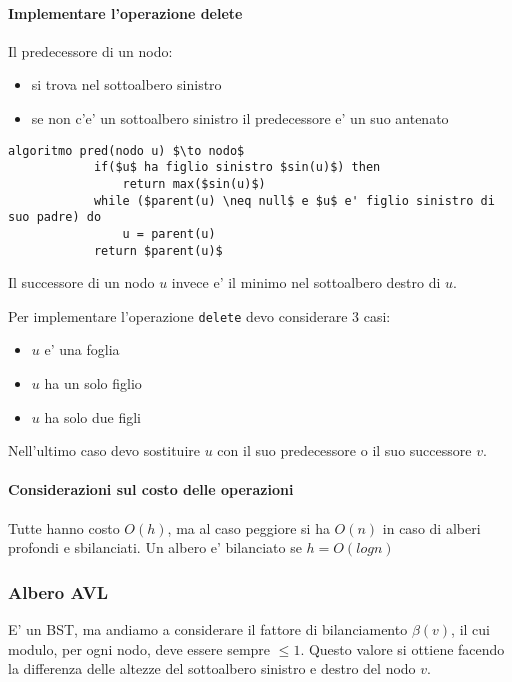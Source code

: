     \paragraph{Implementare l'operazione delete}
    Il predecessore di un nodo:
    \begin{itemize}
        \item si trova nel sottoalbero sinistro
        \item se non c'e' un sottoalbero sinistro il predecessore e' un suo antenato
    \end{itemize}

    \begin{lstlisting}[mathescape=true]
        algoritmo pred(nodo u) $\to nodo$
            if($u$ ha figlio sinistro $sin(u)$) then
                return max($sin(u)$)
            while ($parent(u) \neq null$ e $u$ e' figlio sinistro di suo padre) do
                u = parent(u)
            return $parent(u)$
    \end{lstlisting}

    Il successore di un nodo $u$ invece e' il minimo nel sottoalbero destro di $u$.

    Per implementare l'operazione \texttt{delete} devo considerare 3 casi:
    \begin{itemize}
        \item $u$ e' una foglia
        \item $u$ ha un solo figlio
        \item $u$ ha solo due figli
    \end{itemize}

    Nell'ultimo caso devo sostituire $u$ con il suo predecessore o il suo successore $v$.

    \paragraph{Considerazioni sul costo delle operazioni}
    Tutte hanno costo $O(h)$, ma al caso peggiore si ha $O(n)$ in caso di
    alberi profondi e sbilanciati.
    Un albero e' bilanciato se $h=O(log n)$

\subsubsection{Albero AVL}
    E' un BST, ma andiamo a considerare il fattore di bilanciamento $\beta(v)$, il cui modulo,  per ogni nodo, deve essere sempre $\leq 1$. 
    Questo valore si ottiene facendo la differenza delle altezze del sottoalbero sinistro e destro del nodo $v$.

